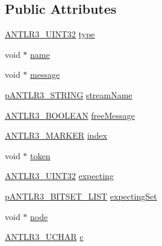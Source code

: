 \subsection*{Public Attributes}
\begin{DoxyCompactItemize}
\item 
\hyperlink{antlr3defs_8h_ac41f744abd0fd25144b9eb9d11b1dfd1}{A\-N\-T\-L\-R3\-\_\-\-U\-I\-N\-T32} \hyperlink{struct_a_n_t_l_r3___e_x_c_e_p_t_i_o_n__struct_a3ffd8f9801f34b7168519896061233e1}{type}
\item 
void $\ast$ \hyperlink{struct_a_n_t_l_r3___e_x_c_e_p_t_i_o_n__struct_a4ea5bbfb664b0b56817c4b0e899190f8}{name}
\item 
void $\ast$ \hyperlink{struct_a_n_t_l_r3___e_x_c_e_p_t_i_o_n__struct_adc72029eff78016a0d31355db228ade0}{message}
\item 
\hyperlink{antlr3interfaces_8h_a36bbe7362079348864db4b4dbdcce56b}{p\-A\-N\-T\-L\-R3\-\_\-\-S\-T\-R\-I\-N\-G} \hyperlink{struct_a_n_t_l_r3___e_x_c_e_p_t_i_o_n__struct_a013938c3f88ca1487710dc9b515d5ca3}{stream\-Name}
\item 
\hyperlink{antlr3defs_8h_a5b33dccbba3b7212539695e21df4079b}{A\-N\-T\-L\-R3\-\_\-\-B\-O\-O\-L\-E\-A\-N} \hyperlink{struct_a_n_t_l_r3___e_x_c_e_p_t_i_o_n__struct_aee1ea267a1e9432e0d4a8a04591a2735}{free\-Message}
\item 
\hyperlink{antlr3defs_8h_a0361e6bf442e07afe923e4d05e9ebc4f}{A\-N\-T\-L\-R3\-\_\-\-M\-A\-R\-K\-E\-R} \hyperlink{struct_a_n_t_l_r3___e_x_c_e_p_t_i_o_n__struct_a4c726c30ad1a60bcea21cab002ad9e39}{index}
\item 
void $\ast$ \hyperlink{struct_a_n_t_l_r3___e_x_c_e_p_t_i_o_n__struct_affd710d1832c636583dfb691a327b3b2}{token}
\item 
\hyperlink{antlr3defs_8h_ac41f744abd0fd25144b9eb9d11b1dfd1}{A\-N\-T\-L\-R3\-\_\-\-U\-I\-N\-T32} \hyperlink{struct_a_n_t_l_r3___e_x_c_e_p_t_i_o_n__struct_a892ba1e891c6a9c7e9e48428facc5ce4}{expecting}
\item 
\hyperlink{antlr3interfaces_8h_a59ad40804c151729987ddc3e78c2d95f}{p\-A\-N\-T\-L\-R3\-\_\-\-B\-I\-T\-S\-E\-T\-\_\-\-L\-I\-S\-T} \hyperlink{struct_a_n_t_l_r3___e_x_c_e_p_t_i_o_n__struct_a49d95b1f53a40224a5791020a7be4761}{expecting\-Set}
\item 
void $\ast$ \hyperlink{struct_a_n_t_l_r3___e_x_c_e_p_t_i_o_n__struct_aea8c0c80b707236ac671997abefaee34}{node}
\item 
\hyperlink{antlr3defs_8h_a078eec1343cdbb862af80f352ea701da}{A\-N\-T\-L\-R3\-\_\-\-U\-C\-H\-A\-R} \hyperlink{struct_a_n_t_l_r3___e_x_c_e_p_t_i_o_n__struct_af1d179f3a7445f6d585c2fe9d141fb9f}{c}

\end{DoxyCompactItemize}
